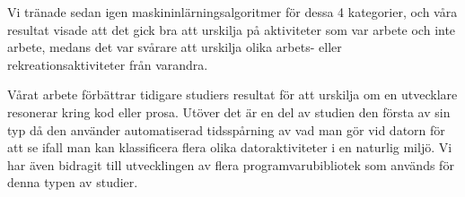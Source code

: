 \documentclass{popsci}
\begin{document}
Vi tränade sedan igen maskininlärningsalgoritmer för dessa 4 kategorier, och våra resultat visade att det gick bra att urskilja på aktiviteter som var arbete och inte arbete, medans det var svårare att urskilja olika arbets- eller rekreationsaktiviteter från varandra.




Vårat arbete förbättrar tidigare studiers resultat för att urskilja om en utvecklare resonerar kring kod eller prosa. Utöver det är en del av studien den första av sin typ då den använder automatiserad tidsspårning av vad man gör vid datorn för att se ifall man kan klassificera flera olika datoraktiviteter i en naturlig miljö. Vi har även bidragit till utvecklingen av flera programvarubibliotek som används för denna typen av studier.
\end{document}
